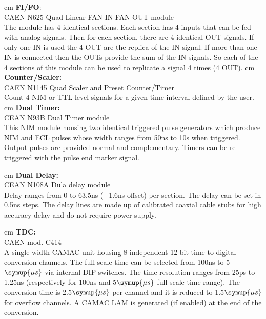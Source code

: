 	 cm
	\textbf{FI/FO}:\\ CAEN N625 Quad Linear FAN-IN FAN-OUT module\\
	The module has 4 identical sections. Each section has 4 inputs that can be fed with analog
    signals. Then for each section, there are 4 identical OUT signals. If only one IN is used the
    4 OUT are the replica of the IN signal. If more than one IN is connected then the OUTs provide
    the sum of the IN signals. So each of the 4 sections of this module can be used to replicate 
    a signal 4 times (4 OUT).
	 cm
	\textbf{Counter/Scaler:}\\ CAEN N1145 Quad Scaler and Preset Counter/Timer\\
	Count 4 NIM or TTL level signals for a given time interval deﬁned by the user.
    	 cm
	\textbf{Dual Timer:}\\ CEAN N93B Dual Timer module\\
	This NIM module housing two identical triggered pulse generators which produce NIM and
	ECL pulses whose width ranges from 50\;ns to 10\;s when triggered. Output pulses are 
	provided normal and complementary. Timers can be re-triggered with the pulse end marker 
	signal.
	
	 cm
	\textbf{Dual Delay:} \\CEAN N108A Dula delay module\\
	Delay ranges from 0 to 63.5\;ns (+1.6\;ns offset) per section. The delay can be set 
	in 0.5\;ns steps. The delay lines are made up of calibrated coaxial cable stubs for high
	accuracy delay and do not require power supply.
	
	 cm
	\textbf{TDC:} \\CAEN mod. C414\\
	A single width CAMAC unit housing 8 independent 12 bit time-to-digital conversion channels.
	The full scale time can be selected from 100\;ns to 5\;$\symup{\mu s}$ via internal
	DIP switches. The time resolution ranges from 25\;ps to 1.25\;ns (respectively for 100\;ns
	and 5\;$\symup{\mu s}$ full scale time range). The conversion time is 2.5\;$\symup{\mu s}$
	per channel and it is reduced to 1.5\;$\symup{\mu s}$ for overflow channels.
	A CAMAC LAM is generated (if enabled) at the end of the conversion.
